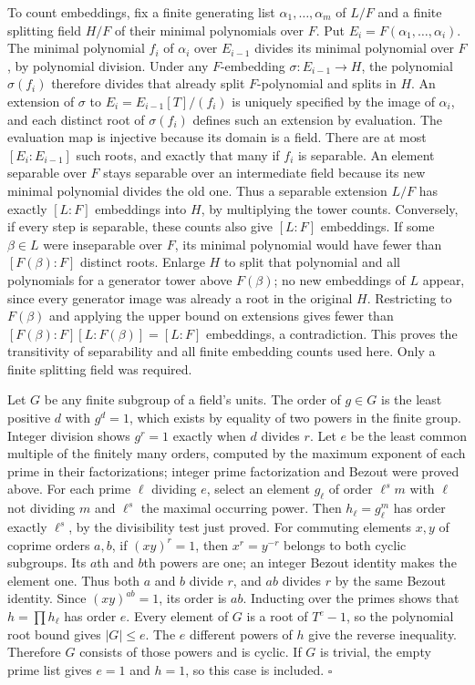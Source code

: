 \documentclass[11pt,a4paper,openany]{report}
\begin{document}
To count embeddings, fix a finite generating list \(\alpha_1,\ldots,\alpha_m\) of \(L/F\) and a finite splitting field \(H/F\) of their minimal polynomials over \(F\). Put \(E_i=F(\alpha_1,\ldots,\alpha_i)\). The minimal polynomial \(f_i\) of \(\alpha_i\) over \(E_{i-1}\) divides its minimal polynomial over \(F\), by polynomial division. Under any \(F\)-embedding \(\sigma:E_{i-1}\to H\), the polynomial \(\sigma(f_i)\) therefore divides that already split \(F\)-polynomial and splits in \(H\). An extension of \(\sigma\) to \(E_i=E_{i-1}[T]/(f_i)\) is uniquely specified by the image of \(\alpha_i\), and each distinct root of \(\sigma(f_i)\) defines such an extension by evaluation. The evaluation map is injective because its domain is a field. There are at most \([E_i:E_{i-1}]\) such roots, and exactly that many if \(f_i\) is separable. An element separable over \(F\) stays separable over an intermediate field because its new minimal polynomial divides the old one. Thus a separable extension \(L/F\) has exactly \([L:F]\) embeddings into \(H\), by multiplying the tower counts. Conversely, if every step is separable, these counts also give \([L:F]\) embeddings. If some \(\beta\in L\) were inseparable over \(F\), its minimal polynomial would have fewer than \([F(\beta):F]\) distinct roots. Enlarge \(H\) to split that polynomial and all polynomials for a generator tower above \(F(\beta)\); no new embeddings of \(L\) appear, since every generator image was already a root in the original \(H\). Restricting to \(F(\beta)\) and applying the upper bound on extensions gives fewer than \([F(\beta):F][L:F(\beta)]=[L:F]\) embeddings, a contradiction. This proves the transitivity of separability and all finite embedding counts used here. Only a finite splitting field was required.

Let \(G\) be any finite subgroup of a field's units. The order of \(g\in G\) is the least positive \(d\) with \(g^d=1\), which exists by equality of two powers in the finite group. Integer division shows \(g^r=1\) exactly when \(d\) divides \(r\). Let \(e\) be the least common multiple of the finitely many orders, computed by the maximum exponent of each prime in their factorizations; integer prime factorization and Bezout were proved above. For each prime \(\ell\) dividing \(e\), select an element \(g_\ell\) of order \(\ell^s m\) with \(\ell\) not dividing \(m\) and \(\ell^s\) the maximal occurring power. Then \(h_\ell=g_\ell^m\) has order exactly \(\ell^s\), by the divisibility test just proved. For commuting elements \(x,y\) of coprime orders \(a,b\), if \((xy)^r=1\), then \(x^r=y^{-r}\) belongs to both cyclic subgroups. Its \(a\)th and \(b\)th powers are one; an integer Bezout identity makes the element one. Thus both \(a\) and \(b\) divide \(r\), and \(ab\) divides \(r\) by the same Bezout identity. Since \((xy)^{ab}=1\), its order is \(ab\). Inducting over the primes shows that \(h=\prod h_\ell\) has order \(e\). Every element of \(G\) is a root of \(T^e-1\), so the polynomial root bound gives \(|G|\le e\). The \(e\) different powers of \(h\) give the reverse inequality. Therefore \(G\) consists of those powers and is cyclic. If \(G\) is trivial, the empty prime list gives \(e=1\) and \(h=1\), so this case is included. \(\square\)
\end{document}
